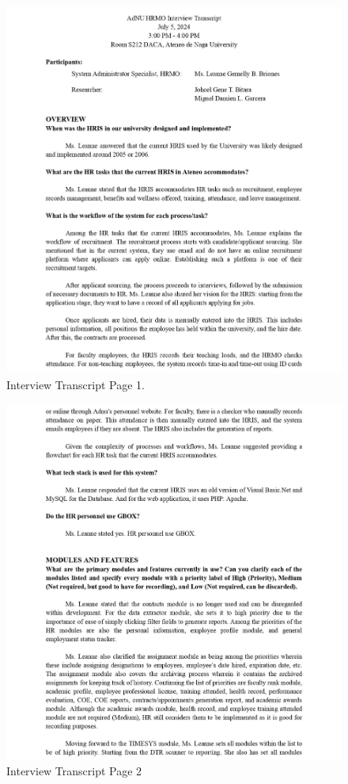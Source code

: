 \begin{figure}[H]
    \centering
    \includegraphics[width=1\linewidth]{figures/misc/interview-transcript-0001.jpg}
    \caption{Interview Transcript Page 1.}
    \label{fig:interview-transcript-0001}
\end{figure}

\begin{figure}[H]
    \centering
    \includegraphics[width=1\linewidth]{figures/misc/interview-transcript-0002.jpg}
    \caption{Interview Transcript Page 2}
    \label{fig:interview-transcript-0002}
\end{figure}

